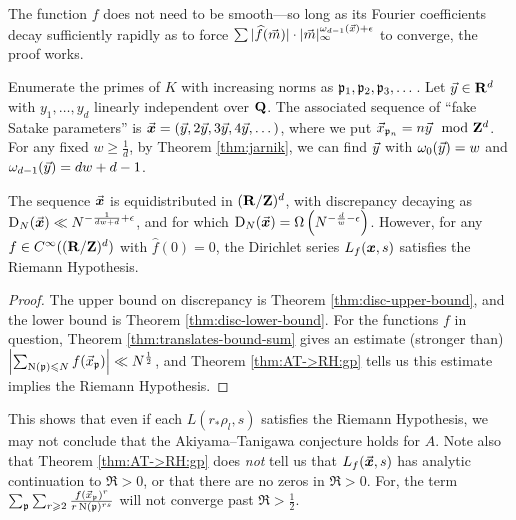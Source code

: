 The function $f$ does not need to be smooth---so long as its Fourier 
coefficients decay sufficiently rapidly as to force 
$\sum |\widehat f(\vec{m})| \cdot |\vec{m}|_\infty^{\omega_{d-1}(\vec{x})+\epsilon}$ to 
converge, the proof works. 

Enumerate the primes of $K$ with increasing norms as $\mathfrak{p}_1,\mathfrak{p}_2,\mathfrak{p}_3,\dots$.  
Let $\vec{y}\in \mathbf{R}^d$ with $y_1,\dots,y_d$ linearly independent over $\mathbf{Q}$. The 
associated sequence of ``fake Satake parameters'' is 
$\vec{\boldsymbol x} = (\vec{y}, 2\vec{y}, 3 \vec{y}, 4 \vec{y}, \dots)$, 
where we put $\vec{x}_{\mathfrak{p}_n} = n \vec{y}\mod {\mathbf{Z}}^d$. For any fixed 
$w\geqslant \frac 1 d$, by Theorem \ref{thm:jarnik}, we can find $\vec{y}$ with 
$\omega_0(\vec{y}) = w$ and $\omega_{d-1}(\vec{y}) = d w + d - 1$. 

\begin{theorem}
The sequence $\vec{\boldsymbol x}$ is equidistributed in $(\mathbf{R}/\mathbf{Z})^d$, with discrepancy 
decaying as $\operatorname{D}_N(\vec{\boldsymbol x}) \ll N^{-\frac{1}{d w+d} + \epsilon}$, and for which 
$\operatorname{D}_N(\vec{\boldsymbol x}) = \Omega\left(N^{-\frac{d}{w} - \epsilon}\right)$. 
However, for any $f\in C^\infty((\mathbf{R}/\mathbf{Z})^d)$ with $\widehat f(0)=0$, the 
Dirichlet series  $L_f({\boldsymbol x},s)$ satisfies the Riemann Hypothesis. 
\end{theorem}
\begin{proof}
The upper bound on discrepancy is Theorem \ref{thm:disc-upper-bound}, and 
the lower bound is Theorem \ref{thm:disc-lower-bound}. For the functions $f$ in 
question, Theorem \ref{thm:translates-bound-sum} gives an estimate (stronger 
than) $\left| \sum_{\operatorname{N}(\mathfrak{p})\leqslant N} f(\vec{x}_{\mathfrak{p}})\right|\ll N^{\frac 1 2}$, and 
Theorem \ref{thm:AT->RH:gp} tells us this estimate implies the Riemann 
Hypothesis. 
\end{proof}

This shows that even if each $L(r_\ast \rho_l,s)$ satisfies the Riemann 
Hypothesis, we may not conclude that the Akiyama--Tanigawa 
conjecture holds for $A$. Note also that Theorem \ref{thm:AT->RH:gp} does 
\emph{not} tell us that $L_f(\vec{\boldsymbol x},s)$ has analytic continuation to $\Re > 0$, or 
that there are no zeros in $\Re > 0$. For, the term 
$\sum_{\mathfrak{p}} \sum_{r\geqslant 2} \frac{f(\vec{x}_{\mathfrak{p}})^r}{r \operatorname{N}(\mathfrak{p})^{r s}}$ will not 
converge past $\Re > \frac 1 2$.
